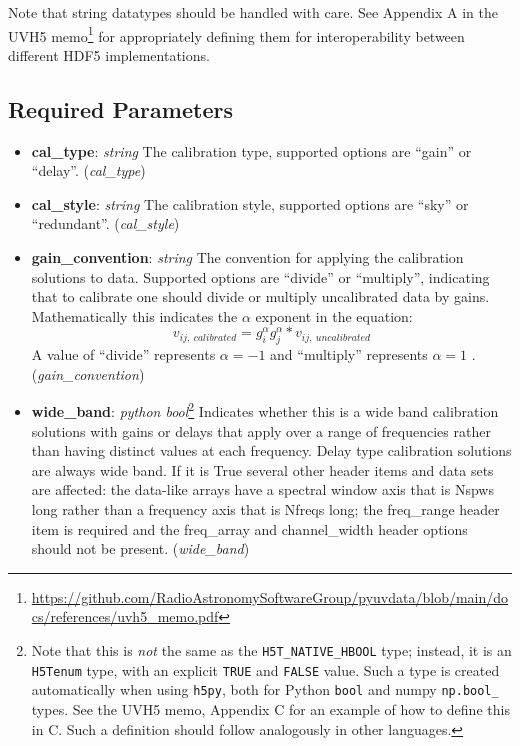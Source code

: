 \documentclass[11pt, oneside]{article}
\begin{document}
Note that string datatypes should be handled with care. See
Appendix A in the UVH5 memo\footnote{\url{https://github.com/RadioAstronomySoftwareGroup/pyuvdata/blob/main/docs/references/uvh5_memo.pdf}}
for appropriately defining them for interoperability between different HDF5
implementations.


\subsection{Required Parameters}
\label{sec:req_params}
\begin{itemize}

\item \textbf{cal\_type}: \textit{string} The calibration type, supported options are
  ``gain'' or ``delay''. (\textit{cal\_type})
\item \textbf{cal\_style}: \textit{string} The calibration style, supported options are
  ``sky'' or ``redundant''. (\textit{cal\_style})
\item \textbf{gain\_convention}: \textit{string} The convention for applying the
  calibration solutions to data. Supported options are  ``divide'' or ``multiply'',
  indicating that to calibrate one should divide or multiply uncalibrated data by
  gains. Mathematically this indicates the $\alpha$ exponent in the equation:
  \begin{equation}
     v_{ij,\ calibrated} =  g_{i}^\alpha g_{j}^\alpha * v_{ij,\ uncalibrated}
  \end{equation}
   A value of ``divide'' represents $\alpha=-1$ and ``multiply'' represents $\alpha=1$ .
  (\textit{gain\_convention})
\item \textbf{wide\_band}: \textit{python bool}\footnote{Note that this is
    \textit{not} the same as the \texttt{H5T\_NATIVE\_HBOOL} type; instead, it
    is an \texttt{H5Tenum} type, with an explicit \texttt{TRUE} and
    \texttt{FALSE} value. Such a type is created automatically when using
    \texttt{h5py}, both for Python \texttt{bool} and numpy \texttt{np.bool\_}
    types. See the UVH5 memo, Appendix C for an example of how to define
    this in C. Such a definition should follow analogously in other languages.}
  Indicates whether this is a wide band calibration solutions with gains or delays
  that apply over a range of frequencies rather than having distinct values at each
  frequency. Delay type calibration solutions are always wide band. If it is True
  several other header items and data sets are affected: the data-like arrays have
  a spectral window axis that is Nspws long rather than a frequency axis that is
  Nfreqs long; the  freq\_range header item is required and the freq\_array and
  channel\_width header options should not be present. (\textit{wide\_band})


\end{itemize}
\end{document}

